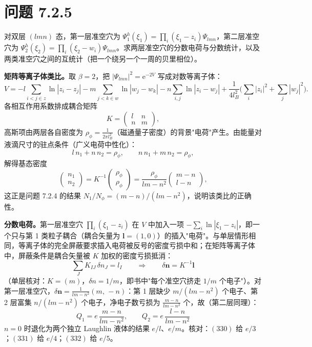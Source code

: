 \section*{问题 7.2.5}
\begin{problem}
对双层 $(lmn)$ 态，第一层准空穴为 $\Psi^h_1(\xi_1)=\prod_i(\xi_1-z_i)\Psi_{lmn}$，第二层准空穴为 $\Psi^h_2(\xi_2)=\prod_i(\xi_2-w_i)\Psi_{lmn}$。求两层准空穴的分数电荷与分数统计，以及两类准空穴之间的互统计（把一个绕另一个一周的贝里相位）。
\end{problem}
\solution
\textbf{矩阵等离子体类比。}取 $\beta=2$，把 $|\Psi_{lmn}|^2=\mathrm{e}^{-2V}$ 写成对数等离子体：
\begin{equation*}
V=-l\!\!\sum_{i<j\in z}\!\!\ln|z_i-z_j|-m\!\!\sum_{j<k\in w}\!\!\ln|w_j-w_k|
-n\!\!\sum_{i,j}\!\!\ln|z_i-w_j|
+\frac{1}{4l_B^2}\Big(\sum_i|z_i|^2+\sum_j|w_j|^2\Big).
\end{equation*}
各相互作用系数排成耦合矩阵
\begin{equation*}
K=\begin{pmatrix} l & n\\ n & m\end{pmatrix},
\end{equation*}
高斯项由两层各自密度为 $\rho_\phi=\frac{1}{2\pi l_B^2}$（磁通量子密度）的背景"电荷"产生。由能量对液滴尺寸的驻点条件（广义电荷中性化）：
\begin{equation*}
l\,n_1+n\,n_2=\rho_\phi,
\qquad
n\,n_1+m\,n_2=\rho_\phi ,
\end{equation*}
解得基态密度
\begin{equation*}
\begin{pmatrix} n_1\\ n_2\end{pmatrix}
=K^{-1}\begin{pmatrix}\rho_\phi\\ \rho_\phi\end{pmatrix}
=\frac{\rho_\phi}{lm-n^2}\begin{pmatrix} m-n\\ l-n\end{pmatrix},
\end{equation*}
这正是问题 7.2.4 的结果 $N_1/N_\phi=(m-n)/(lm-n^2)$，说明该类比的正确性。

\textbf{分数电荷。}第一层准空穴 $\prod_i(\xi_1-z_i)$ 在 $V$ 中加入一项 $-\sum_i\ln|\xi_1-z_i|$，即一个只与第 1 类粒子耦合（耦合矢量为 $\pmb{l}=(1,0)$）的插入"电荷"。与单层情形相同，等离子体的完全屏蔽要求插入电荷被反号的密度亏损中和；在矩阵等离子体中，屏蔽条件是耦合矢量被 $K$ 加权的密度亏损抵消：
\begin{equation*}
\sum_J K_{IJ}\,\delta n_J=l_I
\qquad\Longrightarrow\qquad
\delta\pmb{n}=K^{-1}\pmb{l}
\end{equation*}
（单层核对：$K=(m)$，$\delta n=1/m$，即书中"每个准空穴挤走 $1/m$ 个电子"）。对第一层准空穴，$\delta\pmb{n}=\frac{1}{lm-n^2}(m,\,-n)$：第 1 层缺少 $m/(lm-n^2)$ 个电子、第 2 层富集 $n/(lm-n^2)$ 个电子，净电子数亏损为 $\frac{m-n}{lm-n^2}$ 个，故（第二层同理）：
\begin{equation*}
\boxed{\;Q_1=e\,\frac{m-n}{lm-n^2},
\qquad
Q_2=e\,\frac{l-n}{lm-n^2}\;}
\end{equation*}
$n=0$ 时退化为两个独立 Laughlin 液体的结果 $e/l$、$e/m$。核对：$(330)$ 给 $e/3$；$(331)$ 给 $e/4$；$(332)$ 给 $e/5$。

